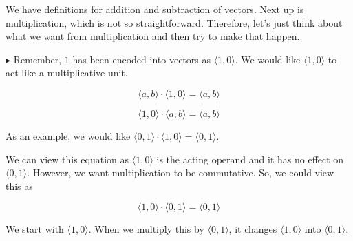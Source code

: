 \documentclass{ximera}
\begin{document}
We have definitions for addition and subtraction of vectors.  Next up is multiplication, which is not so straightforward.  Therefore, let's just think about what we want from multiplication and then try to make that happen.

\textbf{\textcolor{red!90!darkgray}{$\blacktriangleright$}} Remember, $1$ has been encoded into vectors as $\langle 1, 0 \rangle$.  We would like $\langle 1, 0 \rangle$ to act like a multiplicative unit.

\[    \langle a, b \rangle \cdot \langle 1, 0 \rangle    = \langle a, b \rangle            \]

\[    \langle 1, 0 \rangle \cdot \langle a, b \rangle    = \langle a, b \rangle            \]


As an example, we would like $\langle 0, 1 \rangle \cdot \langle 1, 0 \rangle    = \langle 0, 1 \rangle $.

We can view this equation as $\langle 1, 0 \rangle$ is the acting operand and it has no effect on $\langle 0, 1 \rangle$.  However, we want multiplication to be commutative.  So, we could view this as 

\[    \langle 1, 0 \rangle \cdot \langle 0, 1 \rangle    = \langle 0, 1 \rangle            \]

We start with $\langle 1, 0 \rangle$.  When we multiply this by $\langle 0, 1 \rangle$, it changes $\langle 1, 0 \rangle$ into $\langle 0, 1 \rangle$.









\begin{image}
\end{image}
\end{document}
